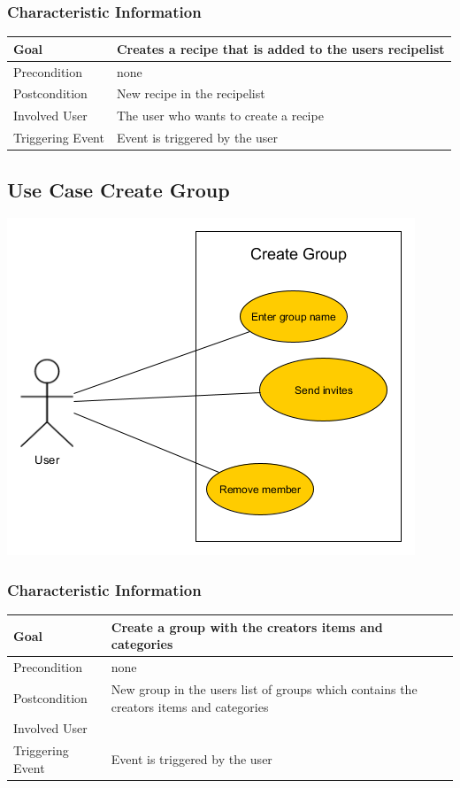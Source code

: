\documentclass[12pt]{article}
\theoremstyle{definition}
\begin{document}
\subsubsection{Characteristic Information}

\begin{tabular}{|l|l|}
\hline
Goal & Creates a recipe that is added to the users recipelist  \\ \hline
Precondition & none \\ \hline
Postcondition & New recipe in the recipelist \\ \hline
Involved User & The user who wants to create a recipe \\ \hline
Triggering Event & Event is triggered by the user \\ \hline
\end{tabular}

\subsection{Use Case Create Group}

\includegraphics[scale=.5]{UseCaseCreateGroup.png}\\



\subsubsection{Characteristic Information}

\begin{tabular}{|l|l|}
\hline
Goal &  Create a group with the creators items and categories\\ \hline
Precondition & none\\ \hline
Postcondition & New group in the users list of groups which contains the creators items and categories \\ \hline
Involved User &  \\ \hline
Triggering Event & Event is triggered by the user \\ \hline
\end{tabular}
\end{document}
